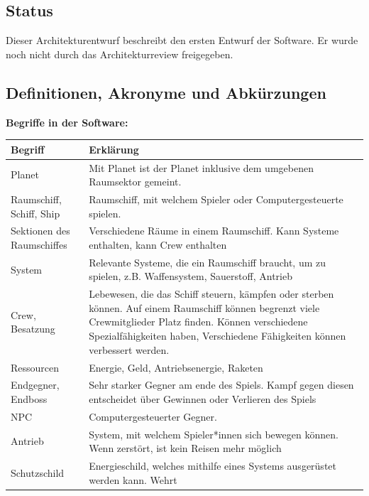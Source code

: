 \documentclass[fontsize=12pt,paper=a4,twoside]{scrartcl}
\begin{document}
\subsection{Status}

Dieser Architekturentwurf beschreibt den ersten Entwurf der Software. Er wurde noch nicht durch das Architekturreview freigegeben. 
  
\subsection{Definitionen, Akronyme und Abkürzungen}

\textbf{Begriffe in der Software:}
\begin{center}
\begin{tabular}{|p{3cm}|p{12cm}|}
\hline
Begriff & Erklärung \\ \hline
Planet & Mit Planet ist der Planet inklusive dem umgebenen Raumsektor gemeint. \\ \hline
Raumschiff, Schiff, Ship & Raumschiff, mit welchem Spieler oder Computergesteuerte spielen. \\ \hline
Sektionen des Raumschiffes & Verschiedene Räume in einem Raumschiff. Kann Systeme enthalten, kann Crew enthalten\\ \hline
System & Relevante Systeme, die ein Raumschiff braucht, um zu spielen, z.B. Waffensystem, Sauerstoff, Antrieb \\ \hline
Crew, Besatzung & Lebewesen, die das Schiff steuern, kämpfen oder sterben können. Auf einem Raumschiff können begrenzt viele Crewmitglieder Platz finden. Können verschiedene Spezialfähigkeiten haben, Verschiedene Fähigkeiten können verbessert werden. \\ \hline
Ressourcen & Energie, Geld, Antriebsenergie, Raketen \\ \hline
Endgegner, Endboss & Sehr starker Gegner am ende des Spiels. Kampf gegen diesen entscheidet über Gewinnen oder Verlieren des Spiels \\ \hline  
NPC & Computergesteuerter Gegner.\\ \hline
Antrieb & System, mit welchem Spieler*innen sich bewegen können. Wenn zerstört, ist kein Reisen mehr möglich\\ \hline
Schutzschild & Energieschild, welches mithilfe eines Systems ausgerüstet werden kann. Wehrt \\ \hline

\end{tabular}
\end{center}
\end{document}
